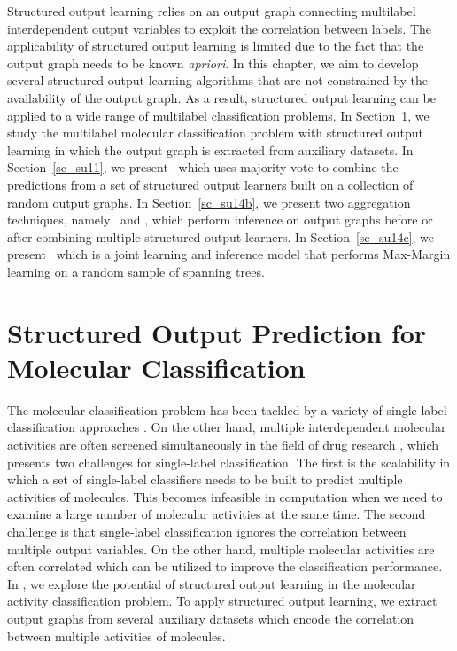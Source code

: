 {Structured output learning relies on an output graph connecting multilabel interdependent output variables to exploit the correlation between labels.
The applicability of structured output learning is limited due to the fact that the output graph needs to be known \textit{apriori}.
In this chapter, we aim to develop several structured output learning algorithms that are not constrained by the availability of the output graph.
As a result, structured output learning can be applied to a wide range of multilabel classification problems.
In Section~\ref{sc_su10}, we study the multilabel molecular classification problem with structured output learning in which the output graph is extracted from auxiliary datasets.
In Section~\ref{sc_su11}, we present \mve\ which uses majority vote to combine the predictions from a set of structured output learners built on a collection of random output graphs.
In Section~\ref{sc_su14b}, we present two aggregation techniques, namely \amm\ and \mam, which perform inference on output graphs before or after combining multiple structured output learners.
In Section~\ref{sc_su14c}, we present \rta\ which is a joint learning and inference model that performs Max-Margin learning on a random sample of spanning trees.



%
%
\section{Structured Output Prediction for Molecular Classification} \label{sc_su10}

The molecular classification problem has been tackled by a variety of single-label classification approaches \citep{Menchetti05weighted,Singh12qsar,Dutt12classification}.
On the other hand, multiple interdependent molecular activities are often screened simultaneously in the field of drug research \citep{Shoemaker06the}, which presents two challenges for single-label classification.
The first is the scalability in which a set of single-label classifiers needs to be built to predict multiple activities of molecules.
This becomes infeasible in computation when we need to examine a large number of molecular activities at the same time.
The second challenge is that single-label classification ignores the correlation between multiple output variables.
On the other hand, multiple molecular activities are often correlated which can be utilized to improve the classification performance.
In , we explore the potential of structured output learning in the molecular activity classification problem.
To apply structured output learning, we extract output graphs from several auxiliary datasets which encode the correlation between multiple activities of molecules.


}
